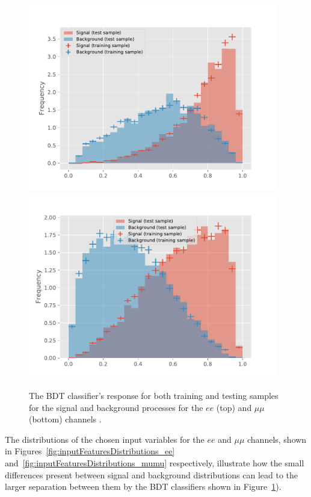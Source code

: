 \begin{figure}[htb]
\centering
\includegraphics[width=0.97\textwidth]{figs/background-estimation/plots/response_ee.pdf}
\\
\includegraphics[width=0.97\textwidth]{figs/background-estimation/plots/response_mumu.pdf}
\caption{
The BDT classifier's response for both training and testing samples for the signal and background processes for the $ee$ (top) and $\mu\mu$ (bottom) channels .}
\label{fig:bdtResponse}
\end{figure}

The distributions of the chosen input variables for the $ee$ and $\mu\mu$ channels, shown in Figures~\ref{fig:inputFeaturesDistributions_ee} and~\ref{fig:inputFeaturesDistributions_mumu} respectively, illustrate how the small differences present between signal and background distributions can lead to the larger separation between them by the BDT classifiers shown in Figure~\ref{fig:bdtResponse}).

